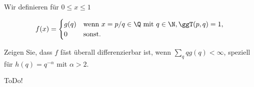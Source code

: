 
\begin{exercise}

Wir definieren für $0 \leq x \leq 1$

\begin{align*}
    f(x)
    =
    \begin{cases}
        g(q) & \text{wenn}~ x = p/q \in \Q ~\text{mit}~ q \in \N, \ggT(p, q) = 1, \\
        0    & \text{sonst}.
    \end{cases}
\end{align*}

Zeigen Sie, dass $f$ fäst überall differenzierbar ist, wenn $\sum_q q g(q) < \infty$, speziell für $h(q) = q^{-\alpha}$ mit $\alpha > 2$.

\end{exercise}


\begin{solution}

ToDo!

\end{solution}

